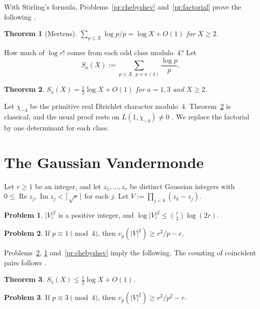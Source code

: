 \documentclass[reqno]{amsart}
\theoremstyle{definition}
\newtheorem{problem}{Problem}[section]
\theoremstyle{plain}
\newtheorem{theorem}{Theorem}[section]
\begin{document}
With Stirling's formula, Problems~\ref{pr:chebyshev} and~\ref{pr:factorial} prove the following \cite{Mer}.

\begin{theorem}[Mertens]\label{thm:mertens}
\(\sum_{p \le X} \log p/p = \log X + O(1)\) for \(X \ge 2\).
\end{theorem}

How much of \(\log r!\) comes from each odd class modulo~\(4\)?  Let
\[
  S_a(X) := \sum_{p \le X,\ p \equiv a \ (4)} \frac{\log p}{p}.
\]

\begin{theorem}\label{thm:mod4}
\(S_a(X) = \frac12 \log X + O(1)\) for \(a = 1, 3\) and \(X \ge 2\).
\end{theorem}

Let \(\chi_{-4}\) be the primitive real Dirichlet character modulo~\(4\).  Theorem~\ref{thm:mod4} is classical, and the usual proof rests on \(L(1, \chi_{-4}) \ne 0\) \cite[Ch.~4]{MV}.  We replace the factorial by one determinant for each class.

\section{The Gaussian Vandermonde}\label{sec:vandermonde}

Let \(r \ge 1\) be an integer, and let \(z_1, \dots, z_r\) be distinct Gaussian integers with \(0 \le \operatorname{Re} z_j, \operatorname{Im} z_j < \lceil \sqrt r \rceil\) for each \(j\).  Let \(V := \prod_{j < k} (z_k - z_j)\).

\begin{problem}\label{pr:V-size}
\(\lvert V \rvert^2\) is a positive integer, and \(\log \lvert V \rvert^2 \le \binom r2 \log(2r)\).
\end{problem}

\begin{problem}\label{pr:V-split}
If \(p \equiv 1 \pmod 4\), then \(v_p(\lvert V \rvert^2) \ge r^2/p - r\).
\end{problem}

Problems~\ref{pr:V-split}, \ref{pr:V-size} and~\ref{pr:chebyshev} imply the following.  The counting of coincident pairs follows \cite[\S2]{PV}.

\begin{theorem}\label{thm:split}
\(S_1(X) \le \frac12 \log X + O(1)\).
\end{theorem}

\begin{problem}\label{pr:V-inert}
If \(p \equiv 3 \pmod 4\), then \(v_p(\lvert V \rvert^2) \ge r^2/p^2 - r\).
\end{problem}
\end{document}
